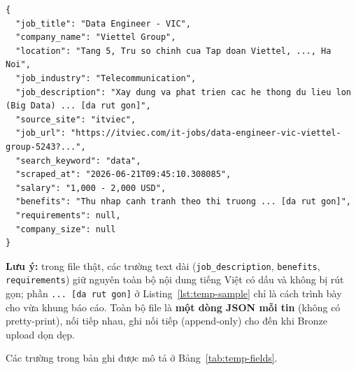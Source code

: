 \begin{lstlisting}[style=jsonstyle,caption={Mẫu một bản ghi JSONL xuất ra temp folder (đã rút gọn trường text dài)},label={lst:temp-sample}]
{
  "job_title": "Data Engineer - VIC",
  "company_name": "Viettel Group",
  "location": "Tang 5, Tru so chinh cua Tap doan Viettel, ..., Ha Noi",
  "job_industry": "Telecommunication",
  "job_description": "Xay dung va phat trien cac he thong du lieu lon (Big Data) ... [da rut gon]",
  "source_site": "itviec",
  "job_url": "https://itviec.com/it-jobs/data-engineer-vic-viettel-group-5243?...",
  "search_keyword": "data",
  "scraped_at": "2026-06-21T09:45:10.308085",
  "salary": "1,000 - 2,000 USD",
  "benefits": "Thu nhap canh tranh theo thi truong ... [da rut gon]",
  "requirements": null,
  "company_size": null
}
\end{lstlisting}

\textbf{Lưu ý:} trong file thật, các trường text dài (\texttt{job\_description},
\texttt{benefits}, \texttt{requirements}) giữ nguyên toàn bộ nội dung tiếng
Việt có dấu và không bị rút gọn; phần \texttt{... [da rut gon]} ở Listing~\ref{lst:temp-sample}
chỉ là cách trình bày cho vừa khung báo cáo. Toàn bộ file là \textbf{một dòng
JSON mỗi tin} (không có pretty-print), nối tiếp nhau, ghi nối tiếp (append-only)
cho đến khi Bronze upload dọn dẹp.

Các trường trong bản ghi được mô tả ở Bảng~\ref{tab:temp-fields}.

